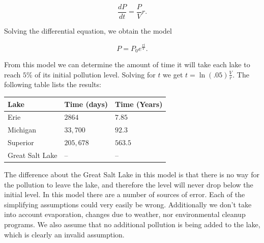 \documentclass[12pt]{article}
\newenvironment{exercise}[2][Exercise]{\begin{trivlist}
\item[\hskip \labelsep {\bfseries #1}\hskip \labelsep {\bfseries #2.}]}{\end{trivlist}}
\begin{document}
\begin{exercise}{1}
$$\frac{dP}{dt} = \frac{P}{V}r.$$ 

Solving the differential equation, we obtain the model 

$$P = P_0 e^{\frac{rt}{V}}.$$

From this model we can determine the amount of time it will take each lake to reach $5\%$ of its initial pollution level. Solving for $t$ we get $t = \ln{(.05)} \frac{V}{r}.$ The following table lists the results:
\begin{center}
	\begin{tabular}{lll}
		Lake & Time (days) & Time (Years) \\ \hline
		Erie & $2864$ & $7.85$ \\
		Michigan & $33,700$ & $92.3$ \\
		Superior & $205,678$ & $563.5$ \\
		Great Salt Lake & -- & -- \\
	\end{tabular}
\end{center}
The difference about the Great Salt Lake in this model is that there is no way for the pollution to leave the lake, and therefore the level will never drop below the initial level. 
In this model there are a number of sources of error. Each of the simplifying assumptions could very easily be wrong. Additionally we don't take into account evaporation, changes due to weather, nor environmental cleanup programs. We also assume that no additional pollution is being added to the lake, which is clearly an invalid assumption.

\end{exercise}
 
\end{document}
